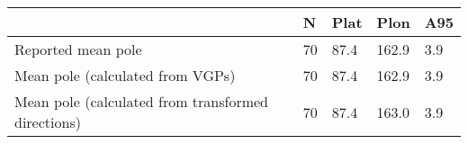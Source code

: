 \begin{tabular}{lllll}
\toprule
{} &   N &  Plat &   Plon &  A95 \\
\midrule
Reported mean pole                                 &  70 &  87.4 &  162.9 &  3.9 \\
Mean pole (calculated from VGPs)                   &  70 &  87.4 &  162.9 &  3.9 \\
Mean pole (calculated from transformed directions) &  70 &  87.4 &  163.0 &  3.9 \\
\bottomrule
\end{tabular}
